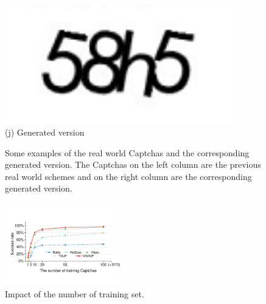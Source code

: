 \begin{figure}
{\begin{minipage}[t]{0.2\textwidth}
        \includegraphics[width=0.9\textwidth]{fig/generate_captchas/baidu_generator.png}\\
        \center (j) Generated version
    \end{minipage}
    }
  \caption{Some examples of the real world Captchas and the corresponding generated version. The Captchas on the left column are the previous real world schemes and on the right column are the corresponding generated version.}
  \label{fig: generate_show}
\end{figure}

\begin{figure}
  \centering
  \includegraphics[width=0.45\textwidth]{fig/training_set.pdf}
  \caption{Impact of the number of training set.}
  \label{fig: training_set}
\end{figure}


